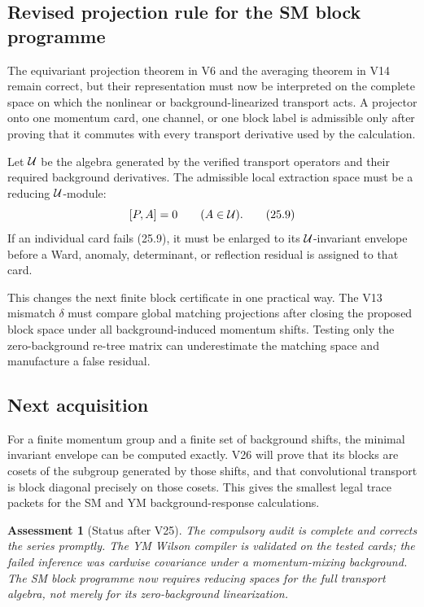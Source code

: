 \documentclass[11pt]{article}
\newtheorem{assessment}[theorem]{Assessment}
\theoremstyle{remark}
\begin{document}
\subsection{Revised projection rule for the SM block programme}

The equivariant projection theorem in V6 and the averaging theorem in
V14 remain correct, but their representation must now be interpreted
on the complete space on which the nonlinear or background-linearized
transport acts.  A projector onto one momentum card, one channel, or
one block label is admissible only after proving that it commutes with
every transport derivative used by the calculation.

Let \({\cal U}\) be the algebra generated by the verified transport
operators and their required background derivatives.  The admissible
local extraction space must be a reducing \({\cal U}\)-module:
\[
                         [P,A]=0\qquad(A\in{\cal U}).        \tag{25.9}
\]
If an individual card fails (25.9), it must be enlarged to its
\({\cal U}\)-invariant envelope before a Ward, anomaly, determinant,
or reflection residual is assigned to that card.

This changes the next finite block certificate in one practical way.
The V13 mismatch \(\delta\) must compare global matching projections
after closing the proposed block space under all background-induced
momentum shifts.  Testing only the zero-background re-tree matrix can
underestimate the matching space and manufacture a false residual.

\subsection{Next acquisition}

For a finite momentum group and a finite set of background shifts,
the minimal invariant envelope can be computed exactly.  V26 will
prove that its blocks are cosets of the subgroup generated by those
shifts, and that convolutional transport is block diagonal precisely
on those cosets.  This gives the smallest legal trace packets for the
SM and YM background-response calculations.

\begin{assessment}[Status after V25]
\label{ass:v12v25-status}
The compulsory audit is complete and corrects the series promptly.
The YM Wilson compiler is validated on the tested cards; the failed
inference was cardwise covariance under a momentum-mixing
background.  The SM block programme now requires reducing spaces for
the full transport algebra, not merely for its zero-background
linearization.
\end{assessment}
\end{document}

